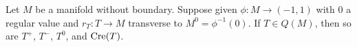 \begin{corollary}\label{C: creasing Q}
	Let $M$ be a manifold without boundary.
	Suppose given $\phi \colon M \to (-1,1)$ with $0$ a regular value and $r_T \colon T \to M$ transverse to $M^0 = \phi^{-1}(0)$.
	If $T \in Q(M)$, then so are $T^+$, $T^-$, $T^0$, and $\mathrm{Cre}(T)$.
\end{corollary}

